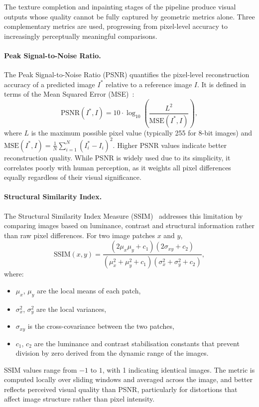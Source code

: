 The texture completion and inpainting stages of the pipeline produce visual outputs whose quality cannot be fully captured by geometric metrics alone. Three complementary metrics are used, progressing from pixel-level accuracy to increasingly perceptually meaningful comparisons.

\paragraph{Peak Signal-to-Noise Ratio.}
The Peak Signal-to-Noise Ratio (\gls{PSNR}) quantifies the pixel-level reconstruction accuracy of a predicted image $I^*$ relative to a reference image $I$. It is defined in terms of the Mean Squared Error (MSE)~\cite{wang_image_2004}:
\begin{equation}
\label{eq:psnr}
\text{PSNR}(I^*, I) = 10 \cdot \log_{10} \left( \frac{L^2}{\text{MSE}(I^*, I)} \right),
\end{equation}
where $L$ is the maximum possible pixel value (typically 255 for 8-bit images) and $\text{MSE}(I^*, I) = \frac{1}{N} \sum_{i=1}^{N} (I^*_i - I_i)^2$. Higher \gls{PSNR} values indicate better reconstruction quality. While \gls{PSNR} is widely used due to its simplicity, it correlates poorly with human perception, as it weights all pixel differences equally regardless of their visual significance.

\paragraph{Structural Similarity Index.}
The Structural Similarity Index Measure (\gls{SSIM})~\cite{wang_image_2004} addresses this limitation by comparing images based on luminance, contrast and structural information rather than raw pixel differences. For two image patches $x$ and $y$,
\begin{equation}
\label{eq:ssim}
\text{SSIM}(x, y) = \frac{(2\mu_x \mu_y + c_1)(2\sigma_{xy} + c_2)}{(\mu_x^2 + \mu_y^2 + c_1)(\sigma_x^2 + \sigma_y^2 + c_2)},
\end{equation}
where:
\begin{itemize}
    \item $\mu_x$, $\mu_y$ are the local means of each patch,
    \item $\sigma_x^2$, $\sigma_y^2$ are the local variances,
    \item $\sigma_{xy}$ is the cross-covariance between the two patches,
    \item $c_1$, $c_2$ are the luminance and contrast stabilisation constants that prevent division by zero derived from the dynamic range of the images.
\end{itemize}
\gls{SSIM} values range from $-1$ to $1$, with 1 indicating identical images. The metric is computed locally over sliding windows and averaged across the image, and better reflects perceived visual quality than \gls{PSNR}, particularly for distortions that affect image structure rather than pixel intensity.

